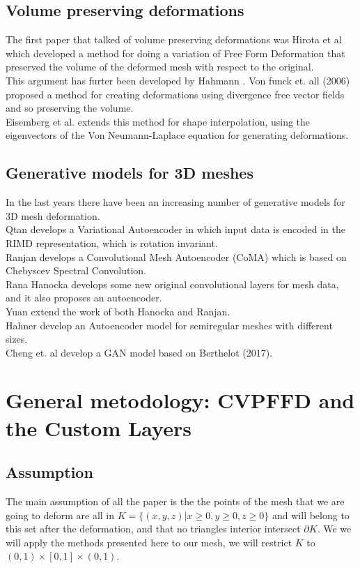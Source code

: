 \documentclass{article}
\begin{document}
\subsection{Volume preserving deformations}
The first paper that talked of volume preserving deformations was Hirota et al \cite{hirota} which developed a method for doing a variation of Free Form Deformation that preserved the volume of the deformed mesh with respect to the original.\\
This argument has furter been developed by Hahmann \cite{hahmann}.
Von funck \cite{vonfunck} et. all (2006) proposed a method for creating deformations using divergence free vector fields and so preserving the volume.\\
Eisemberg et al. \cite{eisemberg} extends this method for shape interpolation, using the eigenvectors of the Von Neumann-Laplace equation for generating deformations. 
\subsection{Generative models for 3D meshes}
In the last years there have been an increasing number of generative models for 3D mesh deformation.\\
Qtan \cite{qtan} develops a Variational Autoencoder in which input data is encoded in the RIMD representation, which is rotation invariant.\\
Ranjan\cite{ranjan} develops a Convolutional Mesh Autoencoder (CoMA) which is based on Chebyscev Spectral Convolution.\\
Rana Hanocka \cite{hanocka} develops some new original convolutional layers for mesh data, and it also proposes an autoencoder.\\
Yuan \cite{yuan} extend the work of both Hanocka and Ranjan.\\
Hahner \cite{hahner} develop an Autoencoder model for semiregular meshes with different sizes.\\
Cheng \cite{cheng} et. al develop a GAN model based on Berthelot (2017).\\

\section{General metodology: CVPFFD and the Custom Layers}


\subsection{Assumption}
The main assumption of all the paper is the the points of the mesh that we are going to deform are all in $K=\{(x,y,z)|x\ge 0, y \ge 0, z\ge 0\}$ and will belong to this set after the deformation, and that no triangles interior intersect $\partial K$.  
We we will apply the methods presented here to our mesh, we will restrict $K$ to $(0,1)\times [0,1]\times(0,1)$.
\end{document}
